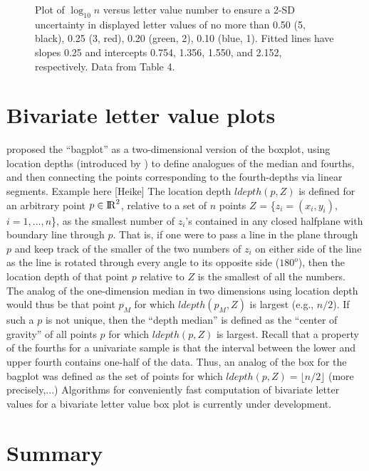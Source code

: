 \documentclass[oneside]{article}
\newcommand{\Reals}{{\rm I\kern-.1667em{}R}}
\begin{document}
\begin{figure}[hbtp]
  \centering

  \caption{Plot of $\log_10 n$ versus letter value number to ensure a 2-SD
  uncertainty in displayed letter values of no more than 0.50 (5, black), 0.25
  (3, red), 0.20 (green, 2), 0.10 (blue, 1). Fitted lines have slopes 0.25 and
  intercepts 0.754, 1.356, 1.550, and 2.152, respectively. Data from Table 4.}
  \label{figyy} 
\end{figure}

\section{Bivariate letter value plots}
\label{sec:bivariate}

\citet{bagplots} proposed the ``bagplot'' as a two-dimensional version of the boxplot, using location depths (introduced by \citet{tukey75}) to define analogues of the median and fourths, and then connecting the points corresponding to the fourth-depths via linear segments. 
Example here [Heike]
The location depth $ldepth(p,Z)$ is defined for an arbitrary point $p \in \Reals^2$, relative to a set of $n$ points $Z$ = \{$z_i = (x_i, y_i)$, $i = 1,...,n$\}, as the smallest number of $z_i$'s contained in any closed halfplane with boundary line through $p$. That is, if one were to pass a line in the plane through $p$ and keep track of the smaller of the two numbers of $z_i$ on either side of the line as the line is rotated through every angle to its opposite side ($180^o$), then the location depth of that point $p$ relative to $Z$ is the smallest of all the numbers. The analog of the one-dimension median in two dimensions using location depth would thus be that point $p_M$ for which $ldepth(p_M, Z)$ is largest (e.g., $n/2$). If such a $p$ is not unique, then the ``depth median'' is defined as the ``center of gravity'' of all points $p$ for which $ldepth(p,Z)$ is largest. Recall that a property of the fourths for a univariate sample is that the interval between the lower and upper fourth contains one-half of the data. Thus, an analog of the box for the bagplot was defined as the set of points for which $ldepth(p,Z) = \lfloor n/2 \rfloor$ (more precisely,...) Algorithms for conveniently fast computation of bivariate letter values for a bivariate letter value box plot is currently under development.

\section{Summary}
\label{sec:summary}
\end{document}
